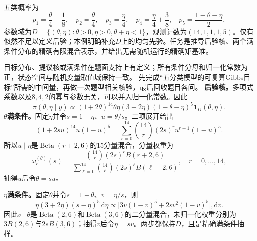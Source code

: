 \label{struct:V5-C04-CH32}
\begin{example}[五分类模型的可复算Gibbs目标]\label{exm:V5-C04-five-category}
五类概率为
\[
p_1=\frac\theta4+\frac18,
\quad p_2=\frac\theta4,
\quad p_3=\frac\eta4,
\quad p_4=\frac\eta4+\frac38,
\quad p_5=\frac{1-\theta-\eta}{2},
\]
参数域为$D=\{(\theta,\eta):\theta>0,\eta>0,\theta+\eta<1\}$，观测计数为$(14,1,1,1,5)$。仅有似然不足以定义后验；本例明确补充$D$上的均匀先验。任务是推导后验核、两个满条件分布的精确有限混合表示，并给出无需随机运行的精确矩基准。
\end{example}

\label{struct:V5-C04-CH33}
\begin{solution}
\SolGiven 目标分布、提议核或满条件在题面支持上有定义；所有条件分母和归一化常数为正，状态空间与随机变量取值域保持一致。
\SolPlan 先完成“五分类模型的可复算Gibbs目标”所需的中间量，再做一次题型相关核验，最后回收题目各问。
\SolDerive
\textbf{后验核。}多项式系数以及$8,4,2$的幂与参数无关，可以并入归一化常数。因此
\begin{equation}\label{eq:V5-C04-five-posterior}
\pi(\theta,\eta\mid y)
\propto
(1+2\theta)^{14}\theta\eta(3+2\eta)
(1-\theta-\eta)^5\mathbf 1_D(\theta,\eta).
\end{equation}
\textbf{$\theta$满条件。}固定$\eta$并令$s=1-\eta$、$u=\theta/s$。二项展开给出
\[
(1+2su)^{14}u(1-u)^5
=\sum_{r=0}^{14}\binom{14}{r}(2s)^r
u^{r+1}(1-u)^5.
\]
所以$u\mid\eta$是$\operatorname{Beta}(r+2,6)$的15分量混合，分量权重为
\begin{equation}\label{eq:V5-C04-theta-mixture}
\omega_r^{(\theta)}(s)
=\frac{\binom{14}{r}(2s)^r B(r+2,6)}
{\sum_{\ell=0}^{14}\binom{14}{\ell}(2s)^\ell B(\ell+2,6)},
\quad r=0,\ldots,14,
\end{equation}
抽得$u$后令$\theta=su$。

\textbf{$\eta$满条件。}固定$\theta$并令$s=1-\theta$、$v=\eta/s$，则
\[
\eta(3+2\eta)(s-\eta)^5\,\mathrm d\eta
\propto
\bigl[3v(1-v)^5+2s v^2(1-v)^5\bigr],\mathrm dv.
\]
因此$v\mid\theta$是$\operatorname{Beta}(2,6)$和$\operatorname{Beta}(3,6)$的二分量混合，未归一化权重分别为$3B(2,6)$与$2sB(3,6)$；抽得$v$后令$\eta=sv$。两步都保持$D$，且是精确满条件抽样。


\end{solution}
